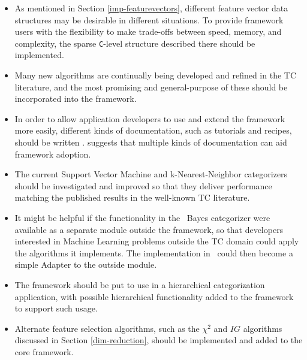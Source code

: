 \begin{itemize}
\item As mentioned in Section \ref{imp-featurevectors}, different
  feature vector data structures may be desirable in different
  situations.  To provide framework users with the flexibility to make
  trade-offs between speed, memory, and complexity, the sparse
  \texttt{C}-level structure described there should be implemented.
\item Many new algorithms are continually being developed and refined
  in the TC literature, and the most promising and general-purpose of
  these should be incorporated into the framework.
\item In order to allow application developers to use and extend the
  framework more easily, different kinds of documentation, such as
  tutorials and recipes, should be written \cite{fayad:99}. suggests
  that multiple kinds of documentation can aid framework adoption.
\item The current Support Vector Machine and k-Nearest-Neighbor
  categorizers should be investigated and improved so that they
  deliver performance matching the published results in the well-known
  TC literature.
\item It might be helpful if the functionality in the \naive\ Bayes
  categorizer were available as a separate module outside the
  framework, so that developers interested in Machine Learning
  problems outside the TC domain could apply the algorithms it
  implements.  The implementation in \aicat\ could then become a
  simple Adapter to the outside module.
\item The framework should be put to use in a hierarchical
  categorization application, with possible hierarchical functionality
  added to the framework to support such usage.
\item Alternate feature selection algorithms, such as the $\chi^2$ and
  $IG$ algorithms discussed in Section \ref{dim-reduction}, should be
  implemented and added to the core framework.
\end{itemize}
